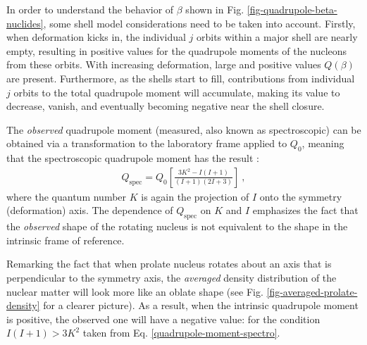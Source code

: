 In order to understand the behavior of $\beta$ shown in Fig. \ref{fig-quadrupole-beta-nuclides}, some shell model considerations need to be taken into account. Firstly, when deformation kicks in, the individual $j$ orbits within a major shell are nearly empty, resulting in positive values for the quadrupole moments of the nucleons from these orbits. With increasing deformation, large and positive values $Q(\beta)$ are present. Furthermore, as the shells start to fill, contributions from individual $j$ orbits to the total quadrupole moment will accumulate, making its value to decrease, vanish, and eventually becoming negative near the shell closure.

The \emph{observed} quadrupole moment (measured, also known as spectroscopic) can be obtained via a transformation to the laboratory frame applied to $Q_0$, meaning that the spectroscopic quadrupole moment has the result \cite{casten2000nuclear}:
\begin{align}
    Q_\text{spec}=Q_0\left[\frac{3K^2-I(I+1)}{(I+1)(2I+3)}\right]\ ,
    \label{quadrupole-moment-spectro}
\end{align}
where the quantum number $K$ is again the projection of $I$ onto the symmetry (deformation) axis. The dependence of $Q_\text{spec}$ on $K$ and $I$ emphasizes the fact that the \emph{observed} shape of the rotating nucleus is not equivalent to the shape in the intrinsic frame of reference.

Remarking the fact that when prolate nucleus rotates about an axis that is perpendicular to the symmetry axis, the \emph{averaged} density distribution of the nuclear matter will look more like an oblate shape (see Fig. \ref{fig-averaged-prolate-density} for a clearer picture). As a result, when the intrinsic quadrupole moment is positive, the observed one will have a negative value: for the condition $I(I+1)>3K^2$ taken from Eq. \ref{quadrupole-moment-spectro}.

